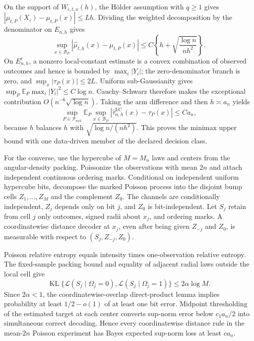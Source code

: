 On the support of \(W_{i,t,x}(h)\), the H\"older assumption with \(q\geq1\) gives
\(|\mu_{t,P}(X_i)-\mu_{t,P}(x)|\leq Lh\).  Dividing the weighted decomposition by the denominator on \(E_{n,h}\) gives
\[
\sup_{x\in\mathcal B_P}|\widehat\mu_{t,h}(x)-\mu_{t,P}(x)|
\leq C\left\{h+\sqrt{\frac{\log n}{nh^2}}\right\}.
\]
On \(E_{n,h}^c\), a nonzero local-constant estimate is a convex combination of observed outcomes and hence is bounded by \(\max_i|Y_i|\); the zero-denominator branch is zero, and \(\sup_x|\tau_P(x)|\leq2L\).  Uniform sub-Gaussianity gives \(\sup_P\mathbb E_P\max_i|Y_i|^2\leq C\log n\).  Cauchy--Schwarz therefore makes the exceptional contribution \(O(n^{-6}\sqrt{\log n})\).  Taking the arm difference and then \(h\asymp a_n\) yields
\[
\sup_{P\in\mathcal P_{\mathrm{rect}}}\mathbb E_P\sup_{x\in\mathcal B_P}
|\widehat\tau^{\mathrm{LC}}_{n,h}(x)-\tau_P(x)|
\leq Ca_n,
\]
because \(h\) balances \(h\) with \(\sqrt{\log n/(nh^2)}\).  This proves the minimax upper bound with one data-driven member of the declared decision class.

For the converse, use the hypercube of \(M=M_n\) laws and centers from the angular-density packing.  Poissonize the observations with mean \(2n\) and attach independent continuous ordering marks.  Conditional on independent uniform hypercube bits, decompose the marked Poisson process into the disjoint bump cells \(Z_1,\ldots,Z_M\) and the complement \(Z_0\).  The channels are conditionally independent, \(Z_j\) depends only on bit \(j\), and \(Z_0\) is bit-independent.  Let \(S_j\) retain from cell \(j\) only outcomes, signed radii about \(x_j\), and ordering marks.  A coordinatewise distance decoder at \(x_j\), even after being given \(Z_{-j}\) and \(Z_0\), is measurable with respect to \((S_j,Z_{-j},Z_0)\).

Poisson relative entropy equals intensity times one-observation relative entropy.  The fixed-sample packing bound and equality of adjacent radial laws outside the local cell give
\[
\operatorname{KL}\{\mathcal L(S_j\mid\Omega_j=0),
\mathcal L(S_j\mid\Omega_j=1)\}
\leq2\alpha\log M.
\]
Since \(2\alpha<1\), the coordinatewise-overlap direct-product lemma implies probability at least \(1/2-o(1)\) of at least one bit error.  Midpoint thresholding of the estimated target at each center converts sup-norm error below \(c_1a_n/2\) into simultaneous correct decoding.  Hence every coordinatewise distance rule in the mean-\(2n\) Poisson experiment has Bayes expected sup-norm loss at least \(ca_n\).

